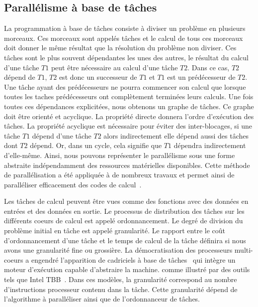 \subsection{Parallélisme à base de tâches}
La programmation à base de tâches consiste à diviser un problème en plusieurs morceaux.
%
Ces morceaux sont appelés tâches et le calcul de tous ces morceaux doit donner le même résultat que la résolution du problème non diviser.
%
Ces tâches sont le plus souvent dépendantes les unes des autres, le résultat du calcul d'une tâche $T1$ peut être nécessaire au calcul d'une tâche $T2$.
%
Dans ce cas, $T2$ dépend de $T1$, $T2$ est donc un successeur de $T1$ et $T1$ est un prédécesseur de $T2$.
%
Une tâche ayant des prédécesseurs ne pourra commencer son calcul que lorsque toutes les taches prédécesseurs ont complètement terminées leurs calculs.
%
Une fois toutes ces dépendances explicitées, nous obtenons un graphe de tâches.
%
Ce graphe doit être orienté et acyclique.
%
La propriété directe donnera l'ordre d'exécution des tâches.
%
La propriété acyclique est nécessaire pour éviter des inter-blocages, si une tâche $T1$ dépend d'une tâche $T2$ alors indirectement elle dépend aussi des tâches dont $T2$ dépend.
%
Or, dans un cycle, cela signifie que $T1$ dépendra indirectement d'elle-même.
%
Ainsi, nous pouvons représenter le parallélisme sous une forme abstraite indépendamment des ressources matérielles disponibles.
%
Cette méthode de parallélisation a été appliquée à de nombreux travaux et permet ainsi de paralléliser efficacement des codes de calcul~\cite{BBAC2014,LSAT2013,LY2012,ABGL2013}.

Les tâches de calcul peuvent être vues comme des fonctions avec des données en entrées et des données en sortie.
%
Le processus de distribution des tâches sur les différents coeurs de calcul est appelé ordonnancement.
%
Le degré de division du problème initial en tâche est appelé granularité.
%
Le rapport entre le coût d'ordonnancement d'une tâche et le temps de calcul de la tâche définira si nous avons une granularité fine ou grossière.
%
La démocratisation des processeurs multi-coeurs a engendré l'apparition de cadriciels à base de tâches~\cite{taskscomparison} qui intègre un moteur d'exécution capable d'abstraire la machine.
 comme illustré par des outils tels que Intel TBB~\cite{Intel_TBB}.
%
Dans ces modèles, la granularité correspond au nombre d'instructions processeur contenu dans la tâche.
%
Cette granularité dépend de l'algorithme à paralléliser ainsi que de l'ordonnanceur de tâches.

